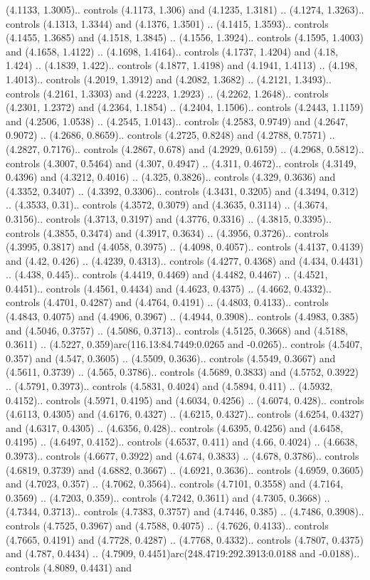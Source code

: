 (4.1133, 1.3005).. controls (4.1173, 1.306) and (4.1235, 1.3181) .. (4.1274, 1.3263).. controls (4.1313, 1.3344) and (4.1376, 1.3501) .. (4.1415, 1.3593).. controls (4.1455, 1.3685) and (4.1518, 1.3845) .. (4.1556, 1.3924).. controls (4.1595, 1.4003) and (4.1658, 1.4122) .. (4.1698, 1.4164).. controls (4.1737, 1.4204) and (4.18, 1.424) .. (4.1839, 1.422).. controls (4.1877, 1.4198) and (4.1941, 1.4113) .. (4.198, 1.4013).. controls (4.2019, 1.3912) and (4.2082, 1.3682) .. (4.2121, 1.3493).. controls (4.2161, 1.3303) and (4.2223, 1.2923) .. (4.2262, 1.2648).. controls (4.2301, 1.2372) and (4.2364, 1.1854) .. (4.2404, 1.1506).. controls (4.2443, 1.1159) and (4.2506, 1.0538) .. (4.2545, 1.0143).. controls (4.2583, 0.9749) and (4.2647, 0.9072) .. (4.2686, 0.8659).. controls (4.2725, 0.8248) and (4.2788, 0.7571) .. (4.2827, 0.7176).. controls (4.2867, 0.678) and (4.2929, 0.6159) .. (4.2968, 0.5812).. controls (4.3007, 0.5464) and (4.307, 0.4947) .. (4.311, 0.4672).. controls (4.3149, 0.4396) and (4.3212, 0.4016) .. (4.325, 0.3826).. controls (4.329, 0.3636) and (4.3352, 0.3407) .. (4.3392, 0.3306).. controls (4.3431, 0.3205) and (4.3494, 0.312) .. (4.3533, 0.31).. controls (4.3572, 0.3079) and (4.3635, 0.3114) .. (4.3674, 0.3156).. controls (4.3713, 0.3197) and (4.3776, 0.3316) .. (4.3815, 0.3395).. controls (4.3855, 0.3474) and (4.3917, 0.3634) .. (4.3956, 0.3726).. controls (4.3995, 0.3817) and (4.4058, 0.3975) .. (4.4098, 0.4057).. controls (4.4137, 0.4139) and (4.42, 0.426) .. (4.4239, 0.4313).. controls (4.4277, 0.4368) and (4.434, 0.4431) .. (4.438, 0.445).. controls (4.4419, 0.4469) and (4.4482, 0.4467) .. (4.4521, 0.4451).. controls (4.4561, 0.4434) and (4.4623, 0.4375) .. (4.4662, 0.4332).. controls (4.4701, 0.4287) and (4.4764, 0.4191) .. (4.4803, 0.4133).. controls (4.4843, 0.4075) and (4.4906, 0.3967) .. (4.4944, 0.3908).. controls (4.4983, 0.385) and (4.5046, 0.3757) .. (4.5086, 0.3713).. controls (4.5125, 0.3668) and (4.5188, 0.3611) .. (4.5227, 0.359)arc(116.13:84.7449:0.0265 and -0.0265).. controls (4.5407, 0.357) and (4.547, 0.3605) .. (4.5509, 0.3636).. controls (4.5549, 0.3667) and (4.5611, 0.3739) .. (4.565, 0.3786).. controls (4.5689, 0.3833) and (4.5752, 0.3922) .. (4.5791, 0.3973).. controls (4.5831, 0.4024) and (4.5894, 0.411) .. (4.5932, 0.4152).. controls (4.5971, 0.4195) and (4.6034, 0.4256) .. (4.6074, 0.428).. controls (4.6113, 0.4305) and (4.6176, 0.4327) .. (4.6215, 0.4327).. controls (4.6254, 0.4327) and (4.6317, 0.4305) .. (4.6356, 0.428).. controls (4.6395, 0.4256) and (4.6458, 0.4195) .. (4.6497, 0.4152).. controls (4.6537, 0.411) and (4.66, 0.4024) .. (4.6638, 0.3973).. controls (4.6677, 0.3922) and (4.674, 0.3833) .. (4.678, 0.3786).. controls (4.6819, 0.3739) and (4.6882, 0.3667) .. (4.6921, 0.3636).. controls (4.6959, 0.3605) and (4.7023, 0.357) .. (4.7062, 0.3564).. controls (4.7101, 0.3558) and (4.7164, 0.3569) .. (4.7203, 0.359).. controls (4.7242, 0.3611) and (4.7305, 0.3668) .. (4.7344, 0.3713).. controls (4.7383, 0.3757) and (4.7446, 0.385) .. (4.7486, 0.3908).. controls (4.7525, 0.3967) and (4.7588, 0.4075) .. (4.7626, 0.4133).. controls (4.7665, 0.4191) and (4.7728, 0.4287) .. (4.7768, 0.4332).. controls (4.7807, 0.4375) and (4.787, 0.4434) .. (4.7909, 0.4451)arc(248.4719:292.3913:0.0188 and -0.0188).. controls (4.8089, 0.4431) and 